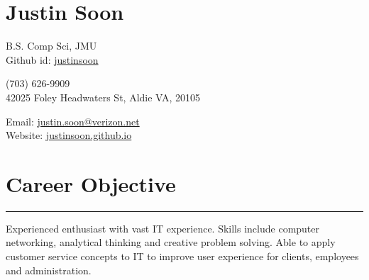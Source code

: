 \documentclass[a4paper]{article}
\author{Justin Soon}
\begin{document}
\section*{\huge\textbf Justin Soon}
\begin{minipage}{.45\linewidth}
	\begin{flushleft}
		B.S. Comp Sci, JMU\\
		Github id: \href{https://github.com/justinsoon}{justinsoon}\\
	\end{flushleft}
\end{minipage}
\hfill
\begin{minipage}{.45\linewidth}
	\begin{center}
		(703) 626-9909\\
		42025 Foley Headwaters St, Aldie VA, 20105\\
	\end{center}
\end{minipage}
\hfill
\begin{minipage}{.45\linewidth}
	\begin{flushright}
		Email: \href{mailto:justin.soon@verizon.net}{justin.soon@verizon.net}\\
		Website: \href{http://justinsoon.github.io/}{justinsoon.github.io}\\
	\end{flushright}
\end{minipage}

\section*{Career Objective}
\hrule
\vspace{3mm}
\begin{minipage}{.45\linewidflusth}
	\begin{flushleft}
	Experienced enthusiast with vast IT experience. Skills include computer networking, analytical thinking and creative problem solving. Able to apply customer service concepts to IT to improve user experience for clients, employees and administration.\\
	\end{flushleft}
\end{minipage}

\end{document}
